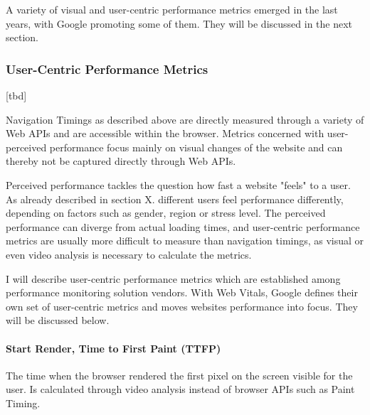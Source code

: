 A variety of visual and user-centric performance metrics emerged in the last years, with Google promoting some of them.
They will be discussed in the next section.






\subsubsection{User-Centric Performance Metrics}


[tbd]



Navigation Timings as described above are directly measured through a variety of Web APIs and are accessible within the browser.
Metrics concerned with user-perceived performance focus mainly on visual changes of the website and can thereby not be captured directly through Web APIs.

Perceived performance tackles the question how fast a website "feels" to a user.
As already described in section X. different users feel performance differently, depending on factors such as gender, region or stress level.
The perceived performance can diverge from actual loading times, and user-centric performance metrics are usually more difficult to measure than navigation timings, as visual or even video analysis is necessary to calculate the metrics. %

I will describe user-centric performance metrics which are established among performance monitoring solution vendors.
With Web Vitals, Google defines their own set of user-centric metrics and moves websites performance into focus.
They will be discussed below.





\paragraph{Start Render, Time to First Paint (TTFP)}

The time when the browser rendered the first pixel on the screen visible for the user.
Is calculated through video analysis instead of browser APIs such as Paint Timing.

